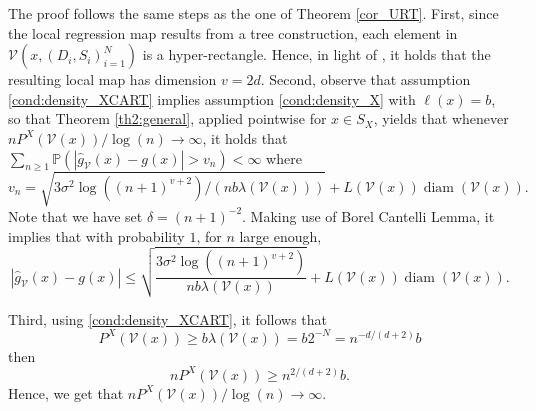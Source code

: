 \documentclass[paper=a4, fontsize=11pt]{scrartcl}
\newcommand{\diam}{\operatorname{diam}}
\begin{document}
The proof follows the same steps as the one of Theorem \ref{cor_URT}. First, since the local regression map results from a tree construction, each element in $\mathcal V ( x, (D_i,S_i)_{i=1}^N )$ is a hyper-rectangle. Hence, in light of \cite{wenocur1981some}, it holds that the resulting local map has dimension $v = 2d$.
Second, observe that assumption \ref{cond:density_XCART} implies assumption \ref{cond:density_X} with $\ell(x) = b$, so that Theorem \ref{th2:general}, applied pointwise for $x \in S_X$, yields that whenever $n P^X(\mathcal{V}(x)) / \log(n) \to \infty$, it holds that
$ \sum_{n\geq 1} \mathbb P ( |\hat g_{\mathcal V}(x) - g(x)| > v_n ) < \infty$
where \[v_n = \sqrt{ 3 \sigma^2 \log( {(n+1)^{v+2}}  ) / (n  b \lambda ( \mathcal V(x)) )}  + L(\mathcal V(x)) \diam (\mathcal V(x)).\] Note that we have set $\delta = (n+1)^{-2}$.  Making use of Borel Cantelli Lemma, it implies that with probability $1$, for $n$ large enough,
$$|\hat g_{\mathcal V}(x) - g(x)| \leq  \sqrt{\frac{ 3 \sigma^2 \log\left( {(n+1)^{v+2}} \right)}{n  b \lambda ( \mathcal V(x)) }} + L(\mathcal V(x)) \diam (\mathcal V(x)).$$

Third, using \ref{cond:density_XCART}, it follows that
$$ P^X (\mathcal{V}(x) ) \geq b \lambda(\mathcal{V}(x)) = b 2^{-N} = n^{-d/(d+2)} b $$
then $$ n P^X (\mathcal{V}(x) ) \geq n^{2/(d+2)} b.$$
Hence, we get that $ n P^X (\mathcal{V}(x) ) / \log(n) \to \infty$.
\end{document}
